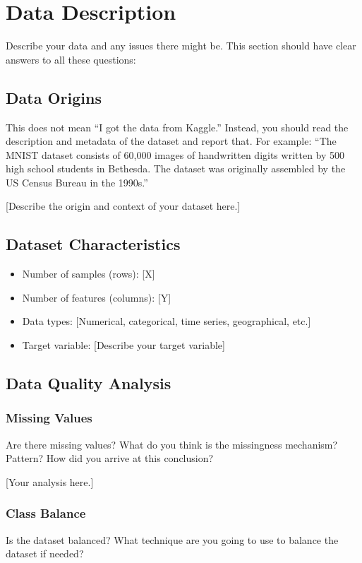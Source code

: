 \documentclass[aps,prl,preprint,groupedaddress]{revtex4-2}
\begin{document}
\section{Data Description}
\label{sec:data}

Describe your data and any issues there might be. This section should have clear answers to all these questions:

\subsection{Data Origins}
This does not mean ``I got the data from Kaggle.'' Instead, you should read the description and metadata of the dataset and report that. For example: ``The MNIST dataset consists of 60,000 images of handwritten digits written by 500 high school students in Bethesda. The dataset was originally assembled by the US Census Bureau in the 1990s.''

[Describe the origin and context of your dataset here.]

\subsection{Dataset Characteristics}
\begin{itemize}
    \item Number of samples (rows): [X]
    \item Number of features (columns): [Y]
    \item Data types: [Numerical, categorical, time series, geographical, etc.]
    \item Target variable: [Describe your target variable]
\end{itemize}

\subsection{Data Quality Analysis}

\subsubsection{Missing Values}
Are there missing values? What do you think is the missingness mechanism? Pattern? How did you arrive at this conclusion?

[Your analysis here.]

\subsubsection{Class Balance}
Is the dataset balanced? What technique are you going to use to balance the dataset if needed?
\end{document}
